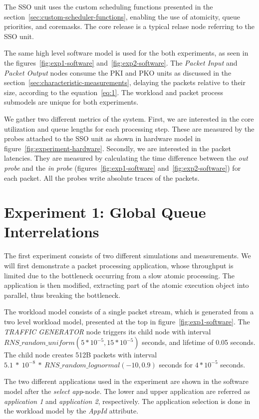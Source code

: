 The SSO unit uses the custom scheduling functions presented in the section~\ref{sec:custom-scheduler-functions}, enabling the use of atomicity, queue priorities, and coremasks. The core release is a typical relase node referring to the SSO unit.

The same high level software model is used for the both experiments, as seen in the figures~\ref{fig:exp1-software} and~\ref{fig:exp2-software}. The \emph{Packet Input} and \emph{Packet Output} nodes consume the PKI and PKO units as discussed in the section~\ref{sec:characteristic-measurements}, delaying the packets relative to their size, according to the equation~\ref{eq:1}. The workload and packet process submodels are unique for both experiments.

We gather two different metrics of the system. First, we are interested in the core utilization and queue lengths for each processing step. These are measured by the probes attached to the SSO unit as shown in hardware model in figure~\ref{fig:experiment-hardware}. Secondly, we are interested in the packet latencies. They are measured by calculating the time difference between the \emph{out probe} and the \emph{in probe} (figures~\ref{fig:exp1-software} and~\ref{fig:exp2-software}) for each packet. All the probes write absolute traces of the packets.

\section{Experiment 1: Global Queue Interrelations}
The first experiment consists of two different simulations and measurements. We will first demonstrate a packet processing application, whose throughput is limited due to the bottleneck occurring from a slow atomic processing. The application is then modified, extracting part of the atomic execution object into parallel, thus breaking the bottleneck.

The workload model consists of a single packet stream, which is generated from a two level workload model, presented at the top in figure~\ref{fig:exp1-software}. The \emph{TRAFFIC GENERATOR} node triggers its child node with interval $RNS\_random\_uniform(5*10^{-5}, 15*10^{-5})$ seconds, and lifetime of 0.05 seconds. The child node creates 512B packets with interval $5.1~*~10^{-8}~*~RNS\_random\_lognormal(-10, 0.9)$ seconds for $4*10^{-5}$ seconds.

The two different applications used in the experiment are shown in the software model after the \emph{select app}-node. The lower and upper application are referred as \emph{application 1} and \emph{application 2}, respectively. The application selection is done in the workload model by the \emph{AppId} attribute.

